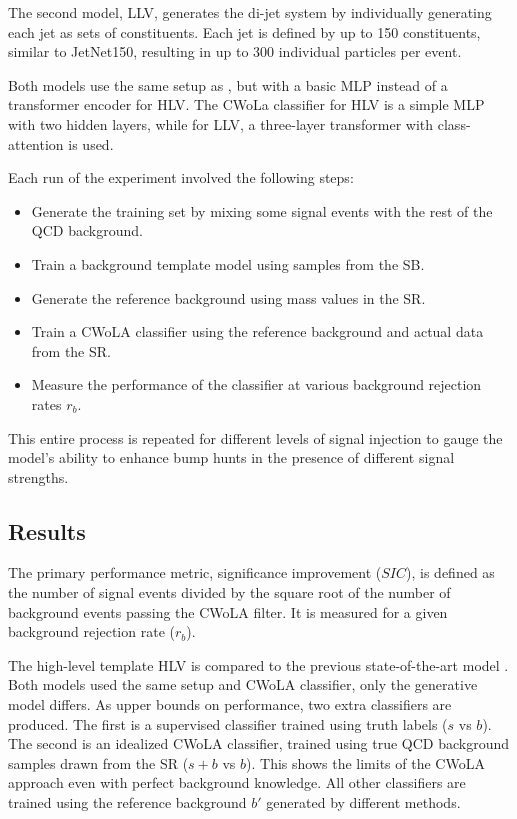 The second model, \drapes LLV, generates the di-jet system by individually generating each jet as sets of constituents.
Each jet is defined by up to 150 constituents, similar to JetNet150, resulting in up to 300 individual particles per event.

Both models use the same setup as \pcdroid, but with a basic MLP instead of a transformer encoder for \drapes HLV.
The CWoLa classifier for \drapes HLV is a simple MLP with two hidden layers, while for \drapes LLV, a three-layer transformer with class-attention is used.

Each run of the experiment involved the following steps:
\begin{itemize}
    \item Generate the training set by mixing some signal events with the rest of the QCD background.
    \item Train a background template model using samples from the SB.
    \item Generate the reference background using mass values in the SR.
    \item Train a CWoLA classifier using the reference background and actual data from the SR.
    \item Measure the performance of the classifier at various background rejection rates $r_b$.
\end{itemize}
This entire process is repeated for different levels of signal injection to gauge the model's ability to enhance bump hunts in the presence of different signal strengths.

\subsection{Results}

The primary performance metric, significance improvement ($SIC$), is defined as the number of signal events divided by the square root of the number of background events passing the CWoLA filter.
It is measured for a given background rejection rate ($r_b$).

The high-level template \drapes HLV is compared to the previous state-of-the-art model \FfF.
Both models used the same setup and CWoLA classifier, only the generative model differs.
As upper bounds on performance, two extra classifiers are produced.
The first is a supervised classifier trained using truth labels ($s$ vs $b$).
The second is an idealized CWoLA classifier, trained using true QCD background samples drawn from the SR ($s+b$ vs $b$).
This shows the limits of the CWoLA approach even with perfect background knowledge.
All other classifiers are trained using the reference background $b'$ generated by different methods.

